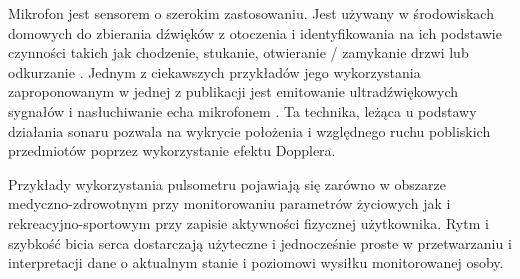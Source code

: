 Mikrofon jest sensorem o szerokim zastosowaniu. Jest używany w środowiskach domowych do zbierania dźwięków z otoczenia i identyfikowania na ich podstawie czynności takich jak chodzenie, stukanie, otwieranie / zamykanie drzwi lub odkurzanie \cite{46_Indor_Audio_Rec}. Jednym z ciekawszych przykładów jego wykorzystania zaproponowanym w jednej z publikacji jest emitowanie ultradźwiękowych sygnałów i nasłuchiwanie echa mikrofonem \cite{22_HAR_Survey_Ultrasonic}. Ta technika, leżąca u podstawy działania sonaru pozwala na wykrycie położenia i względnego ruchu pobliskich przedmiotów poprzez wykorzystanie efektu Dopplera.

Przykłady wykorzystania pulsometru pojawiają się zarówno w obszarze medyczno-zdrowotnym \cite{62_The_Long_Review} przy monitorowaniu parametrów życiowych jak i rekreacyjno-sportowym \cite{51_Fixbit_tracker} przy zapisie aktywności fizycznej użytkownika. Rytm i szybkość bicia serca dostarczają użyteczne i jednocześnie proste w przetwarzaniu i interpretacji dane o aktualnym stanie i poziomowi wysiłku monitorowanej osoby.
